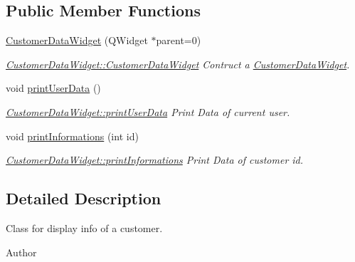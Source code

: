 \subsection*{Public Member Functions}
\begin{DoxyCompactItemize}
\item 
\hyperlink{classGui_1_1Widgets_1_1CustomerDataWidget_a649d25216952fa8642b22983a07c9186}{Customer\+Data\+Widget} (Q\+Widget $\ast$parent=0)
\begin{DoxyCompactList}\small\item\em \hyperlink{classGui_1_1Widgets_1_1CustomerDataWidget_a649d25216952fa8642b22983a07c9186}{Customer\+Data\+Widget\+::\+Customer\+Data\+Widget} Contruct a \hyperlink{classGui_1_1Widgets_1_1CustomerDataWidget}{Customer\+Data\+Widget}. \end{DoxyCompactList}\item 
\hypertarget{classGui_1_1Widgets_1_1CustomerDataWidget_a78504b749fc7d80302c27748a4033b1f}{}void \hyperlink{classGui_1_1Widgets_1_1CustomerDataWidget_a78504b749fc7d80302c27748a4033b1f}{print\+User\+Data} ()\label{classGui_1_1Widgets_1_1CustomerDataWidget_a78504b749fc7d80302c27748a4033b1f}

\begin{DoxyCompactList}\small\item\em \hyperlink{classGui_1_1Widgets_1_1CustomerDataWidget_a78504b749fc7d80302c27748a4033b1f}{Customer\+Data\+Widget\+::print\+User\+Data} Print Data of current user. \end{DoxyCompactList}\item 
void \hyperlink{classGui_1_1Widgets_1_1CustomerDataWidget_aa995ed95c5ca119db4258af2fe403691}{print\+Informations} (int id)
\begin{DoxyCompactList}\small\item\em \hyperlink{classGui_1_1Widgets_1_1CustomerDataWidget_aa995ed95c5ca119db4258af2fe403691}{Customer\+Data\+Widget\+::print\+Informations} Print Data of customer id. \end{DoxyCompactList}\end{DoxyCompactItemize}


\subsection{Detailed Description}
Class for display info of a customer. 

\begin{DoxyAuthor}{Author}

\end{DoxyAuthor}



